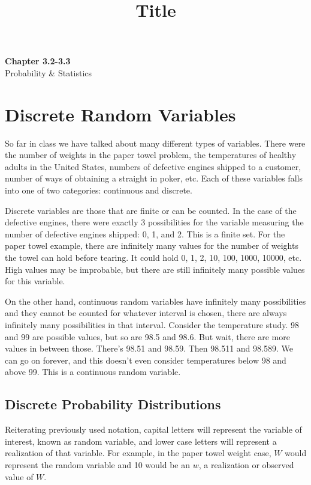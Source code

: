 \documentclass[11pt]{article}
\theoremstyle{definition}
\begin{document}
\title{Title}

\thispagestyle{empty}

\begin{center}
{\LARGE \bf Chapter 3.2-3.3}\\
{\large Probability \& Statistics}
\end{center}

\section{Discrete Random Variables}

So far in class we have talked about many different types of variables. There were the number of weights in the paper towel problem, the temperatures of healthy adults in the United States, numbers of defective engines shipped to a customer, number of ways of obtaining a straight in poker, etc. Each of these variables falls into one of two categories: continuous and discrete.

Discrete variables are those that are finite or can be counted. In the case of the defective engines, there were exactly 3 possibilities for the variable measuring the number of defective engines shipped: 0, 1, and 2. This is a finite set. For the paper towel example, there are infinitely many values for the number of weights the towel can hold before tearing. It could hold 0, 1, 2, 10, 100, 1000, 10000, etc. High values may be improbable, but there are still infinitely many possible values for this variable.

On the other hand, continuous random variables have infinitely many possibilities and they cannot be counted for whatever interval is chosen, there are always infinitely many possibilities in that interval. Consider the temperature study. 98 and 99 are possible values, but so are 98.5 and 98.6. But wait, there are more values in between those. There's 98.51 and 98.59. Then 98.511 and 98.589. We can go on forever, and this doesn't even consider temperatures below 98 and above 99. This is a continuous random variable.

\subsection{Discrete Probability Distributions}

Reiterating previously used notation, capital letters will represent the variable of interest, known as  random variable, and lower case letters will represent a realization of that variable. For example, in the paper towel weight case, $W$ would represent the random variable and 10 would be an $w$, a realization or observed value of $W$.
\end{document}
